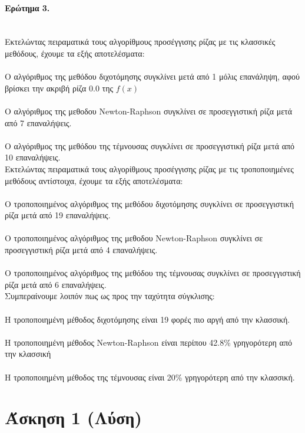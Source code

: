 \documentclass[a4paper,11pt]{article}
\newcommand{\lt}{\latintext}
\begin{document}
\paragraph{Ερώτημα 3.}\mbox{}\\
Εκτελώντας πειραματικά τους αλγορίθμους προσέγγισης ρίζας με τις κλασσικές μεθόδους, έχουμε τα εξής αποτελέσματα:\\
\\ Ο αλγόριθμος της μεθόδου διχοτόμησης συγκλίνει μετά από 1 μόλις επανάληψη, αφού βρίσκει την ακριβή ρίζα 0.0 της {\lt $f(x)$}\\
\\ Ο αλγόριθμος της μεθοδου {\lt Newton-Raphson} συγκλίνει σε προσεγγιστική ρίζα μετά από 7 επαναλήψεις.\\
\\ Ο αλγόριθμος της μεθόδου της τέμνουσας συγκλίνει σε προσεγγιστική ρίζα μετά από 10 επαναλήψεις.\\

Εκτελώντας πειραματικά τους αλγορίθμους προσέγγισης ρίζας με τις τροποποιημένες μεθόδους αντίστοιχα, έχουμε τα εξής αποτελέσματα:\\
\\ Ο τροποποιημένος αλγόριθμος της μεθόδου διχοτόμησης συγκλίνει σε προσεγγιστική ρίζα μετά από 19 επαναλήψεις.\\
\\ Ο τροποποιημένος αλγόριθμος της μεθοδου {\lt Newton-Raphson} συγκλίνει σε προσεγγιστική ρίζα μετά από 4 επαναλήψεις.\\
\\ Ο τροποποιημένος αλγόριθμος της μεθόδου της τέμνουσας συγκλίνει σε προσεγγιστική ρίζα μετά από 6 επαναλήψεις.\\

Συμπεραίνουμε λοιπόν πως ως προς την ταχύτητα σύγκλισης:\\
\\Η τροποποιημένη μέθοδος διχοτόμησης είναι 19 φορές πιο αργή από την κλασσική.\\
\\Η τροποποιημένη μέθοδος {\lt Newton-Raphson} είναι περίπου 42.8\% γρηγορότερη από την κλασσική\\
\\Η τροποποιημένη μέθοδος της τέμνουσας είναι 20\% γρηγορότερη από την κλασσική.\\



			
		

\section{Άσκηση 1 (Λύση)}
	
\end{document}
